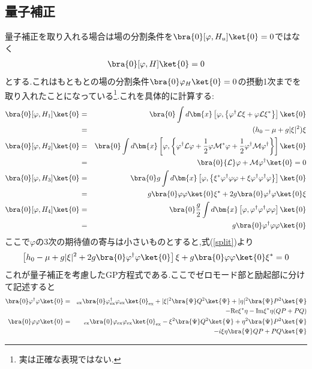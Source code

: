 \documentclass[10.5pt,a4paper]{jreport}
\begin{document}
\subsection{量子補正}
量子補正を取り入れる場合は場の分割条件を$\bra{0}[\varphi,H_u]\ket{0}=0$ではなく
\begin{eqnarray}
  \bra{0}[\varphi,H]\ket{0} = 0 \label{split}
\end{eqnarray}
とする.これはもともとの場の分割条件$\bra{0}\varphi_H\ket{0} = 0$の摂動1次までを取り入れたことになっている\footnote{実は正確な表現ではない. }.これを具体的に計算する:
\begin{eqnarray}
  \nonumber  \bra{0}[\varphi,H_1]\ket{0} &=& \bra{0}\int d\bm{x}\left[\varphi,\left\{\varphi^\dagger{\cal L}\xi+\varphi{\cal L}\xi^*\right\}\right]\ket{0}\\
  &=& (h_0 - \mu + g|\xi|^2)\xi\\
  \nonumber  \bra{0}[\varphi,H_2]\ket{0} &=& \bra{0}\int d\bm{x}\left[\varphi,\left\{\varphi^\dagger{\cal L}\varphi+\frac{1}{2}\varphi{\cal M}^*\varphi + \frac{1}{2}\varphi^\dagger{\cal M}\varphi^\dagger\right\}\right]\ket{0}\\
  &=& \bra{0}{\cal L}\varphi + {\cal M}\varphi^\dagger \ket{0} = 0\\
  \nonumber  \bra{0}[\varphi,H_3]\ket{0} &=& \bra{0}g\int d\bm{x}\left[\varphi,\left\{\xi^*\varphi^\dagger\varphi\varphi + \xi\varphi^\dagger\varphi^\dagger\varphi \right\}\right]\ket{0}\\
  &=& g\bra{0}\varphi\varphi\ket{0}\xi^* + 2g\bra{0}\varphi^\dagger\varphi\ket{0}\xi\\
  \nonumber  \bra{0}[\varphi,H_4]\ket{0} &=& \bra{0}\frac{g}{2}\int d\bm{x}\left[\varphi,\varphi^\dagger\varphi^\dagger\varphi\varphi\right]\ket{0}\\
  &=& g\bra{0}\varphi^\dagger\varphi\varphi\ket{0}
\end{eqnarray}
ここで$\varphi$の3次の期待値の寄与は小さいものとすると,式(\ref{split})より
\begin{eqnarray}
  \left[h_0 - \mu + g|\xi|^2 + 2g\bra{0}\varphi^\dagger\varphi\ket{0}\right]\xi + g\bra{0}\varphi\varphi\ket{0}\xi^* = 0
\end{eqnarray}
これが量子補正を考慮したGP方程式である.ここでゼロモード部と励起部に分けて記述すると
\begin{eqnarray}
  \nonumber \bra{0}\varphi^\dagger\varphi\ket{0} &=& _{\rm ex}\bra{0}\varphi^\dagger_{\rm ex}\varphi_{\rm ex}\ket{0}_{\rm ex} + |\xi|^2\bra{\Psi}Q^2\ket{\Psi} + |\eta|^2\bra{\Psi}P^2\ket{\Psi} \\
  &&\ \ \ \ \ \ \ \ -{\rm Re}\xi^*\eta -{\rm Im}\xi^*\eta(QP + PQ)\\
  \nonumber  \bra{0}\varphi\varphi\ket{0} &=& _{\rm ex}\bra{0}\varphi_{\rm ex}\varphi_{\rm ex}\ket{0}_{\rm ex} - \xi^2\bra{\Psi}Q^2\ket{\Psi} + \eta^2\bra{\Psi}P^2\ket{\Psi} \\
  &&\ \ \ \ \ \ \ \ -i\xi\eta\bra{\Psi}QP + PQ\ket{\Psi}
\end{eqnarray}
\end{document}
